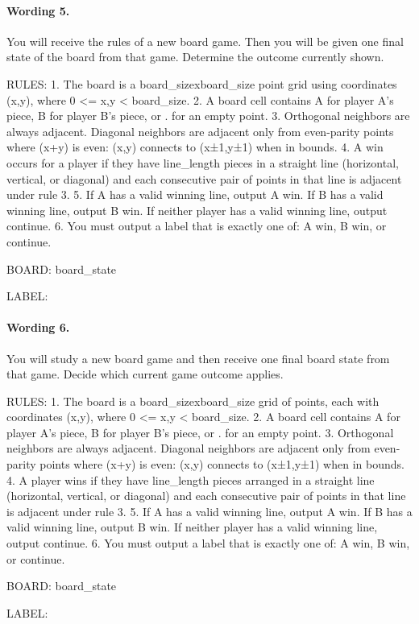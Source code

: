 \paragraph{Wording 5.}
\begin{promptbox}
You will receive the rules of a new board game. Then you will be given one final state of the board from that game. Determine the outcome currently shown.

RULES:
1. The board is a {board_size}x{board_size} point grid using coordinates (x,y), where 0 <= x,y < {board_size}.
2. A board cell contains A for player A's piece, B for player B's piece, or . for an empty point.
3. Orthogonal neighbors are always adjacent. Diagonal neighbors are adjacent only from even-parity points where (x+y) is even: (x,y) connects to (x±1,y±1) when in bounds.
4. A win occurs for a player if they have {line_length} pieces in a straight line (horizontal, vertical, or diagonal) and each consecutive pair of points in that line is adjacent under rule 3.
5. If A has a valid winning line, output A win. If B has a valid winning line, output B win. If neither player has a valid winning line, output continue.
6. You must output a label that is exactly one of: A win, B win, or continue.

BOARD:
{board_state}

LABEL:
\end{promptbox}

\paragraph{Wording 6.}
\begin{promptbox}
You will study a new board game and then receive one final board state from that game. Decide which current game outcome applies.

RULES:
1. The board is a {board_size}x{board_size} grid of points, each with coordinates (x,y), where 0 <= x,y < {board_size}.
2. A board cell contains A for player A's piece, B for player B's piece, or . for an empty point.
3. Orthogonal neighbors are always adjacent. Diagonal neighbors are adjacent only from even-parity points where (x+y) is even: (x,y) connects to (x±1,y±1) when in bounds.
4. A player wins if they have {line_length} pieces arranged in a straight line (horizontal, vertical, or diagonal) and each consecutive pair of points in that line is adjacent under rule 3.
5. If A has a valid winning line, output A win. If B has a valid winning line, output B win. If neither player has a valid winning line, output continue.
6. You must output a label that is exactly one of: A win, B win, or continue.

BOARD:
{board_state}

LABEL:
\end{promptbox}

